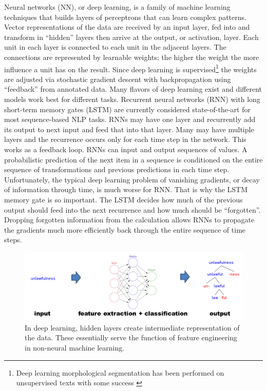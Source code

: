 \documentclass[12pt]{article}
\begin{document}
Neural networks (NN), or deep learning, is a family of machine learning techniques that builds layers of perceptrons that can learn complex patterns. Vector representations of the data are received by an input layer, fed into and transform in ``hidden'' layers then arrive at the output, or activation, layer.  Each unit in each layer is connected to each unit in the adjacent layers. The connections are represented by learnable weights; the higher the weight the more influence a unit has on the result. Since deep learning is supervised\footnote{Deep learning morphological segmentation has been performed on unsupervised texts with some success \cite{wang_morphological_2016}} the weights are adjusted via stochastic gradient descent with backpropagation using ``feedback'' from annotated data. Many flavors of deep learning exist and different models work best for different tasks. Recurrent neural networks (RNN) \cite{Elman91} with long short-term memory gates (LSTM) \cite{Hochreiter_1997} are currently considered state-of-the-art for most sequence-based NLP tasks. RNNs may have one layer and recurrently add its output to next input and feed that into that layer. Many may have multiple layers and the recurrence occurs only for each time step in the network. This works as a feedback loop. RNNs can input and output sequences of values. A probabilistic prediction of the next item in a sequence is conditioned on the entire sequence of transformations and previous predictions in each time step. Unfortunately, the typical deep learning problem of vanishing gradients, or decay of information through time, is much worse for RNN. That is why the LSTM memory gate is so important. The LSTM decides how much of the previous output should feed into the next recurrence and how much should be ``forgotten''. Dropping forgotten information from the calculation allows RNNs to propagate the gradients much more efficiently back through the entire sequence of time steps.

\begin{figure}[tb]
\begin{center}
\includegraphics[width=0.95\columnwidth]{DL.PNG}
\caption{In deep learning, hidden layers create intermediate representation of the data. These essentially serve the function of feature engineering in non-neural machine learning.}
\label{fig:DL}
\end{center}
\end{figure}
\end{document}
